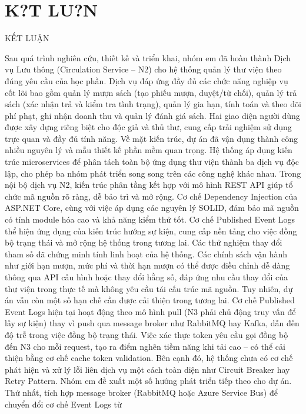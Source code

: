 \chapter*{K?T LU?N}

KẾT LUẬN

Sau quá trình nghiên cứu, thiết kế và triển khai, nhóm em đã hoàn thành Dịch vụ Lưu thông (Circulation Service – N2) cho hệ thống quản lý thư viện theo đúng yêu cầu của học phần. Dịch vụ đáp ứng đầy đủ các chức năng nghiệp vụ cốt lõi bao gồm quản lý mượn sách (tạo phiếu mượn, duyệt/từ chối), quản lý trả sách (xác nhận trả và kiểm tra tình trạng), quản lý gia hạn, tính toán và theo dõi phí phạt, ghi nhận doanh thu và quản lý đánh giá sách. Hai giao diện người dùng được xây dựng riêng biệt cho độc giả và thủ thư, cung cấp trải nghiệm sử dụng trực quan và đầy đủ tính năng. Về mặt kiến trúc, dự án đã vận dụng thành công nhiều nguyên lý và mẫu thiết kế phần mềm quan trọng. Hệ thống áp dụng kiến trúc microservices để phân tách toàn bộ ứng dụng thư viện thành ba dịch vụ độc lập, cho phép ba nhóm phát triển song song trên các công nghệ khác nhau. Trong nội bộ dịch vụ N2, kiến trúc phân tầng kết hợp với mô hình REST API giúp tổ chức mã nguồn rõ ràng, dễ bảo trì và mở rộng. Cơ chế Dependency Injection của ASP.NET Core, cùng với việc áp dụng các nguyên lý SOLID, đảm bảo mã nguồn có tính module hóa cao và khả năng kiểm thử tốt. Cơ chế Published Event Logs thể hiện ứng dụng của kiến trúc hướng sự kiện, cung cấp nền tảng cho việc đồng bộ trạng thái và mở rộng hệ thống trong tương lai. Các thử nghiệm thay đổi tham số đã chứng minh tính linh hoạt của hệ thống. Các chính sách vận hành như giới hạn mượn, mức phí và thời hạn mượn có thể được điều chỉnh dễ dàng thông qua API cấu hình hoặc thay đổi hằng số, đáp ứng nhu cầu thay đổi của thư viện trong thực tế mà không yêu cầu tái cấu trúc mã nguồn. Tuy nhiên, dự án vẫn còn một số hạn chế cần được cải thiện trong tương lai. Cơ chế Published Event Logs hiện tại hoạt động theo mô hình pull (N3 phải chủ động truy vấn để lấy sự kiện) thay vì push qua message broker như RabbitMQ hay Kafka, dẫn đến độ trễ trong việc đồng bộ trạng thái. Việc xác thực token yêu cầu gọi đồng bộ đến N3 cho mỗi request, tạo ra điểm nghẽn tiềm năng khi tải cao – có thể cải thiện bằng cơ chế cache token validation. Bên cạnh đó, hệ thống chưa có cơ chế phát hiện và xử lý lỗi liên dịch vụ một cách toàn diện như Circuit Breaker hay Retry Pattern. Nhóm em đề xuất một số hướng phát triển tiếp theo cho dự án. Thứ nhất, tích hợp message broker (RabbitMQ hoặc Azure Service Bus) để chuyển đổi cơ chế Event Logs từ

